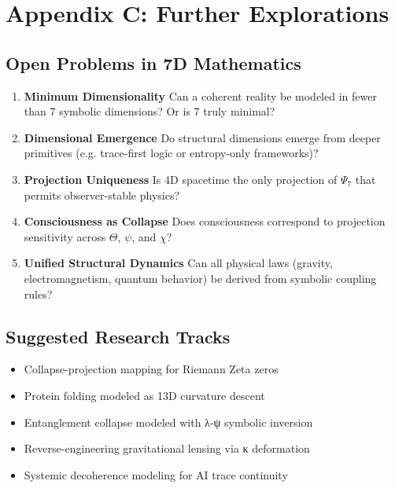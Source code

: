 
\chapter*{Appendix C: Further Explorations}

\section*{Open Problems in 7D Mathematics}

\begin{enumerate}
\item \textbf{Minimum Dimensionality}  
Can a coherent reality be modeled in fewer than 7 symbolic dimensions? Or is 7 truly minimal?

\item \textbf{Dimensional Emergence}  
Do structural dimensions emerge from deeper primitives (e.g. trace-first logic or entropy-only frameworks)?

\item \textbf{Projection Uniqueness}  
Is 4D spacetime the only projection of $\Psi_7$ that permits observer-stable physics?

\item \textbf{Consciousness as Collapse}  
Does consciousness correspond to projection sensitivity across $\Theta$, $\psi$, and $\chi$?

\item \textbf{Unified Structural Dynamics}  
Can all physical laws (gravity, electromagnetism, quantum behavior) be derived from symbolic coupling rules?
\end{enumerate}

\section*{Suggested Research Tracks}

\begin{itemize}
\item Collapse-projection mapping for Riemann Zeta zeros
\item Protein folding modeled as 13D curvature descent
\item Entanglement collapse modeled with λ-ψ symbolic inversion
\item Reverse-engineering gravitational lensing via κ deformation
\item Systemic decoherence modeling for AI trace continuity
\end{itemize}

